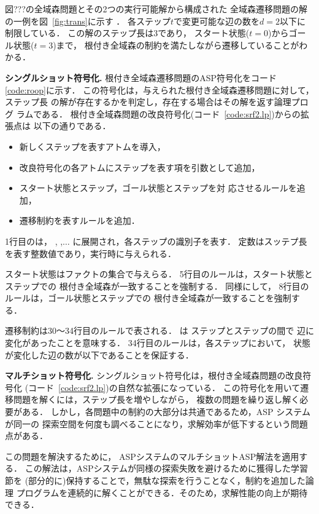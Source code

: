 図???の全域森問題とその2つの実行可能解から構成された
全域森遷移問題の解の一例を図~\ref{fig:trans}に示す
．
各ステップ$t$で変更可能な辺の数を$d=2$以下に制限している．
この解のステップ長は3であり，
スタート状態($t=0$)からゴール状態($t=3$)まで，
根付き全域森の制約を満たしながら遷移していることがわかる．

\textbf{シングルショット符号化.}
根付き全域森遷移問題のASP符号化をコード\ref{code:roop}に示す．
この符号化は，与えられた根付き全域森遷移問題に対して，ステップ長
の解が存在するかを判定し，存在する場合はその解を返す論理プログ
ラムである．
根付き全域森問題の改良符号化(コード~\ref{code:srf2.lp})からの拡張点は
以下の通りである．
\begin{itemize}
\item 新しくステップを表すアトムを導入，
\item 改良符号化の各アトムにステップを表す項を引数として追加，
\item スタート状態とステップ，ゴール状態とステップを対
  応させるルールを追加，
\item 遷移制約を表すルールを追加．
\end{itemize}
1行目のは，
,
,$\dots$
に展開され，各ステップの識別子を表す．
定数はスッテプ長を表す整数値であり，実行時に与えられる．

スタート状態はファクトの集合で与えらる．
5行目のルールは，スタート状態とステップでの
根付き全域森が一致することを強制する．
同様にして，
8行目のルールは，ゴール状態とステップでの
根付き全域森が一致することを強制する．

遷移制約は30〜34行目のルールで表される．
は
ステップとステップの間で
辺に変化があったことを意味する．
34行目のルールは，各ステップにおいて，
状態が変化した辺の数が以下であることを保証する．

\textbf{マルチショット符号化.}
シングルショット符号化は，根付き全域森問題の改良符号化
(コード~\ref{code:srf2.lp})の自然な拡張になっている．
この符号化を用いて遷移問題を解くには，ステップ長を増やしながら，
複数の問題を繰り返し解く必要がある．
しかし，各問題中の制約の大部分は共通であるため，ASP システムが同一の
探索空間を何度も調べることになり，求解効率が低下するという問題点がある．

この問題を解決するために，
ASPシステム{\clingo}のマルチショットASP解法を適用する．
この解法は，ASPシステムが同様の探索失敗を避けるために獲得した学習節を
(部分的に)保持することで，無駄な探索を行うことなく，制約を追加した論理
プログラムを連続的に解くことができる．そのため，求解性能の向上が期待できる．

